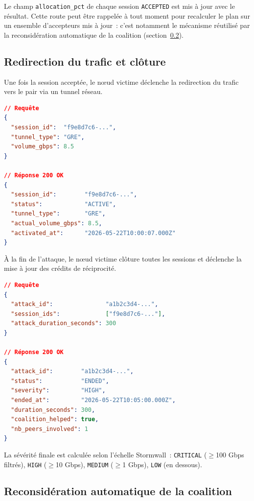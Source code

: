 Le champ \texttt{allocation\_pct} de chaque session \texttt{ACCEPTED} est mis à jour avec le résultat. Cette route peut être rappelée à tout moment pour recalculer le plan sur un ensemble d'accepteurs mis à jour~: c'est notamment le mécanisme réutilisé par la reconsidération automatique de la coalition (section~\ref{subsec:reconsideration}).

\subsection{Redirection du trafic et clôture}

Une fois la session acceptée, le nœud victime déclenche la redirection du trafic vers le pair via un tunnel réseau.

\begin{lstlisting}[language=json, caption={Requête et réponse — \texttt{POST /traffic/redirect}.}, label=lst:redirect]
// Requête
{
  "session_id":  "f9e8d7c6-...",
  "tunnel_type": "GRE",
  "volume_gbps": 8.5
}

// Réponse 200 OK
{
  "session_id":        "f9e8d7c6-...",
  "status":            "ACTIVE",
  "tunnel_type":       "GRE",
  "actual_volume_gbps": 8.5,
  "activated_at":      "2026-05-22T10:00:07.000Z"
}
\end{lstlisting}

À la fin de l'attaque, le nœud victime clôture toutes les sessions et déclenche la mise à jour des crédits de réciprocité.

\begin{lstlisting}[language=json, caption={Requête et réponse — \texttt{POST /attack/over}.}, label=lst:over]
// Requête
{
  "attack_id":               "a1b2c3d4-...",
  "session_ids":             ["f9e8d7c6-..."],
  "attack_duration_seconds": 300
}

// Réponse 200 OK
{
  "attack_id":        "a1b2c3d4-...",
  "status":           "ENDED",
  "severity":         "HIGH",
  "ended_at":         "2026-05-22T10:05:00.000Z",
  "duration_seconds": 300,
  "coalition_helped": true,
  "nb_peers_involved": 1
}
\end{lstlisting}

La sévérité finale est calculée selon l'échelle Stormwall~: \texttt{CRITICAL} ($\geq$100 Gbps filtrés), \texttt{HIGH} ($\geq$10 Gbps), \texttt{MEDIUM} ($\geq$1 Gbps), \texttt{LOW} (en dessous).

\subsection{Reconsidération automatique de la coalition}
\label{subsec:reconsideration}

